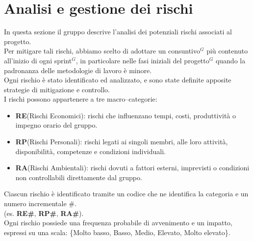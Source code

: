 \section{Analisi e gestione dei rischi}
In questa sezione il gruppo descrive l'analisi dei potenziali rischi associati al progetto.\\
Per mitigare tali rischi, abbiamo scelto di adottare un consuntivo$^G$ più contenuto all'inizio di ogni sprint$^G$, in particolare nelle fasi iniziali del progetto$^G$ quando la padronanza delle metodologie di lavoro è minore.\\
Ogni rischio è stato identificato ed analizzato, e sono state definite apposite strategie di mitigazione e controllo.\\
I rischi possono appartenere a tre macro–categorie: 
\begin{itemize}[itemsep=5pt, parsep=1pt, label=$\scriptstyle\bullet$]
    \item \textbf{RE}(Rischi Economici): rischi che influenzano tempi, costi, produttività o impegno orario del gruppo.
    \item \textbf{RP}(Rischi Personali): rischi legati ai singoli membri, alle loro attività, disponibilità, competenze e condizioni individuali.
    \item \textbf{RA}(Rischi Ambientali): rischi dovuti a fattori esterni, imprevisti o condizioni non controllabili direttamente dal gruppo.
\end{itemize} 
Ciascun rischio è identificato tramite un codice che ne identifica la categoria e un numero incrementale  \#.\\ (es. \textbf{RE\#}, \textbf{RP\#}, \textbf{RA\#}).\\
Ogni rischio possiede una frequenza probabile di avvenimento e un impatto, espressi su una scala: \{Molto basso, Basso, Medio, Elevato, Molto elevato\}.

